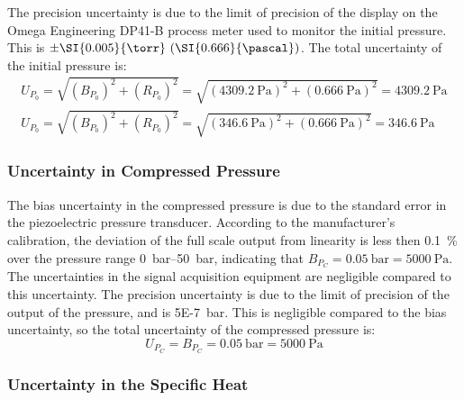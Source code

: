 \documentclass[../main.tex]{subfiles}
\begin{document}
The precision uncertainty is due to the limit of precision of the display
on the Omega Engineering DP41-B process meter used to monitor the initial
pressure. This is $\pm\SI{0.005}{\torr} \ (\SI{0.666}{\pascal})$. The total
uncertainty of the initial pressure is:
%
\begin{subequations}
\begin{align}
U_{P_0} = \sqrt{\left(B_{P_0}\right)^2 + \left(R_{P_0}\right)^2} = \sqrt{\left(\SI{4309.2}{\pascal}\right)^2 + \left(\SI{0.666}{\pascal}\right)^2} = \SI{4309.2}{\pascal} \\
U_{P_0} = \sqrt{\left(B_{P_0}\right)^2 + \left(R_{P_0}\right)^2} = \sqrt{\left(\SI{346.6}{\pascal}\right)^2 + \left(\SI{0.666}{\pascal}\right)^2} = \SI{346.6}{\pascal}
\end{align}
\end{subequations}

\subsubsection{Uncertainty in Compressed Pressure}

The bias uncertainty in the compressed pressure is due to the standard
error in the piezoelectric pressure transducer. According to the
manufacturer's calibration, the deviation of the full scale output from
linearity is less then \SI{0.1}{\percent} over the pressure range \SIrange{0}{50}{\bar},
indicating that $B_{P_C}=\SI{0.05}{\bar}=\SI{5000}{\pascal}$.
The uncertainties in the signal acquisition equipment are negligible
compared to this uncertainty. The precision uncertainty is due to the limit
of precision of the output of the pressure, and is \SI{5E-7}{\bar}. This
is negligible compared to the bias uncertainty, so the total uncertainty
of the compressed pressure is:
%
\begin{equation}
U_{P_C} = B_{P_C} = \SI{0.05}{\bar} = \SI{5000}{\pascal}
\end{equation}

\subsubsection{Uncertainty in the Specific Heat}
\label{sec:unc-cp}
\end{document}

